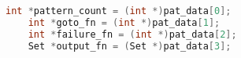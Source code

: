 \begin{lstlisting}[language=C,caption={C unpacking of pattern data},label={lst:c_unpack}]
    int *pattern_count = (int *)pat_data[0];
    int *goto_fn = (int *)pat_data[1];
    int *failure_fn = (int *)pat_data[2];
    Set *output_fn = (Set *)pat_data[3];
\end{lstlisting}
